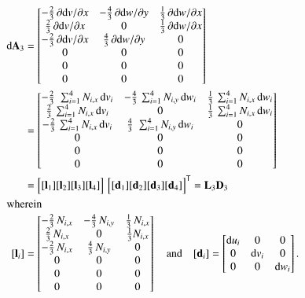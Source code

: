 \begin{subequations}
	\begin{align}
	\mathrm{d} \mathbf{A}_3 & =  \begin{bmatrix}
		- \tfrac{2}{3} \, \partial \mathrm{d} v / \partial x &  - \tfrac{4}{3} \, \partial \mathrm{d} w / \partial y &  \tfrac{1}{3} \, \partial \mathrm{d} w / \partial x   \\
		\tfrac{2}{3} \, \partial \mathrm{d} v / \partial x &  0 & \tfrac{1}{3} \, \partial \mathrm{d} w / \partial x  \\
		- \tfrac{2}{3} \, \partial \mathrm{d} v / \partial x & \tfrac{4}{3} \, \partial \mathrm{d} w / \partial y & 0 \\
		0 &  0 & 0  \\
		0 &  0 & 0  \\
		0 &  0 & 0  \end{bmatrix} \notag\\
	& = \begin{bmatrix}
		- \tfrac{2}{3} \, \, \sum\nolimits_{i=1}^4 N_{i,x} \, \mathrm{d} v_i &  - \tfrac{4}{3} \, \sum\nolimits_{i=1}^4 N_{i,y} \, \mathrm{d} w_i &  \tfrac{1}{3} \, \sum\nolimits_{i=1}^4 N_{i,x} \, \mathrm{d} w_i  \\
		\tfrac{2}{3} \, \sum\nolimits_{i=1}^4 N_{i,x} \, \mathrm{d} v_i &  0 & \tfrac{1}{3} \, \sum\nolimits_{i=1}^4 N_{i,x} \, \mathrm{d} w_i  \\
		- \tfrac{2}{3} \, \sum\nolimits_{i=1}^4 N_{i,x} \, \mathrm{d} v_i & \tfrac{4}{3} \, \, \sum\nolimits_{i=1}^4 N_{i,y} \, \mathrm{d} w_i & 0 \\
		0 &  0 & 0  \\
		0 &  0 & 0  \\
		0 &  0 & 0  \end{bmatrix} \notag \\	
	& = \begin{bmatrix}
	[\mathbf{l}_1] [\mathbf{l}_2] [\mathbf{l}_3] [\mathbf{l}_4] 
	\end{bmatrix}  \, \begin{bmatrix} [\mathbf{d}_1] [\mathbf{d}_2] [\mathbf{d}_3] [\mathbf{d}_4] \end{bmatrix}^{\mathsf{T}}
= \mathbf{L}_3 \mathbf{D}_3 \\
	\intertext{wherein}
	[\mathbf{l}_i] & = \begin{bmatrix}
		- \tfrac{2}{3} \, N_{i,x}  &  - \tfrac{4}{3} \,  N_{i,y}  &  \tfrac{1}{3} \,  N_{i,x} \\
		\tfrac{2}{3} \,  N_{i,x}  &  0 & \tfrac{1}{3}  N_{i,x}  \\
		- \tfrac{2}{3} \,  N_{i,x}  & \tfrac{4}{3} \, N_{i,y}  & 0 \\
		0 &  0 & 0  \\
		0 &  0 & 0  \\
		0 &  0 & 0  \end{bmatrix}  \quad \text{and} \quad	[\mathbf{d}_i] = \begin{bmatrix}
		\mathrm{d} u_i & 0  & 0  \\
		0 &  \mathrm{d} v_i   & 0  \\
		0 & 0 & \mathrm{d} w_i \end{bmatrix} .
	\end{align}
\end{subequations}

